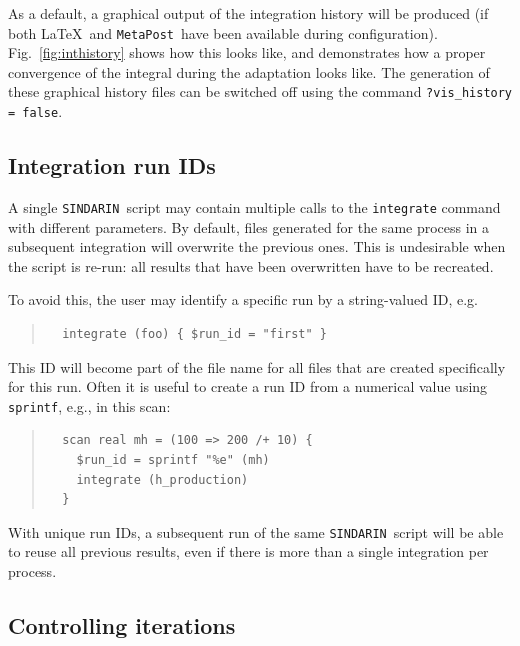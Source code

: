 \documentclass[12pt]{book}
\newcommand{\ttt}[1]{\texttt{#1}}
\newcommand{\metapost}{\ttt{MetaPost}}
\newcommand{\sindarin}{\ttt{SINDARIN}}
\begin{document}
As a default, a graphical output of the integration history will be
produced (if both \LaTeX\ and \metapost\ have been available during
configuration). Fig.~\ref{fig:inthistory} shows how this looks like,
and demonstrates how a proper convergence of the integral during the
adaptation looks like. The generation of these graphical history files
can be switched off using the command \ttt{?vis\_history = false}.


\subsection{Integration run IDs}

A single \sindarin\ script may contain multiple calls to the
\ttt{integrate} command with different parameters.  By default,
files generated for the same process in a subsequent integration will
overwrite the previous ones.  This is undesirable when the script is
re-run: all results that have been overwritten have to be recreated.

To avoid this, the user may identify a specific run by a string-valued
ID, e.g.
\begin{quote}
\begin{footnotesize}
\begin{verbatim}
  integrate (foo) { $run_id = "first" }
\end{verbatim}
\end{footnotesize}
\end{quote}
This ID will become part of the file name for all files that are
created specifically for this run.  Often it is useful to create a run
ID from a numerical value using \ttt{sprintf}, e.g., in this scan:
\begin{quote}
\begin{footnotesize}
\begin{verbatim}
  scan real mh = (100 => 200 /+ 10) {
    $run_id = sprintf "%e" (mh)
    integrate (h_production)
  }
\end{verbatim}
\end{footnotesize}
\end{quote}

With unique run IDs, a subsequent run of the same \sindarin\ script
will be able to reuse all previous results, even if there is more than
a single integration per process.




\subsection{Controlling iterations}
\label{sec:iterations}
\end{document}
